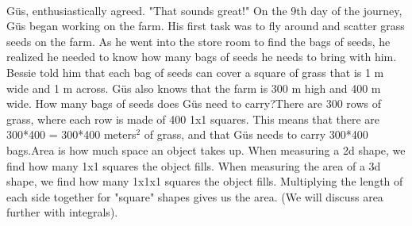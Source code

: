  \paragraph{} Güs, enthusiastically agreed. "That sounds great!"
{On the 9th day of the journey, Güs began working on the farm. His first task was to fly around and scatter grass seeds on the farm. As he went into the store room to find the bags of seeds, he realized he needed to know how many bags of seeds he needs to bring with him. Bessie told him that each bag of seeds can cover a square of grass that is 1 m wide and 1 m across. Güs also knows that the farm is 300 m high and 400 m wide. How many bags of seeds does Güs need to carry?}{There are 300 rows of grass, where each row is made of 400 1x1 squares. This means that there are 300*400 = 300*400 meters$^{2}$ of grass, and that Güs needs to carry 300*400 bags.}{Area is how much space an object takes up. When measuring a 2d shape, we find how many 1x1 squares the object fills. When measuring the area of a 3d shape, we find how many 1x1x1 squares the object fills. Multiplying the length of each side together for "square" shapes gives us the area. (We will discuss area further with integrals).
}{}
